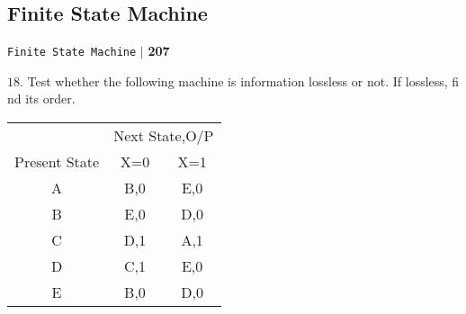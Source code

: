 \documentclass[a4,9pt]{beamer}
\begin{document}
\begin{frame}
\section*{Finite State Machine}
\begin{flushright}
\texttt{Finite State Machine} \hspace*{0.1cm}\textbf{$|$} \hspace*{0.1cm} \textbf{207}\hspace*{0.1cm}
\end{flushright}
\vspace*{0.5cm}

\pause
$18.$ Test whether the following machine is information lossless or not. If lossless, fi nd its order.
\pause
\begin{center}
\begin{tabular}{ccc}
 \hline

 \hline

 \hline

 \hline
 & \multicolumn{2}{c}{Next State,O/P}\\
 \cline{2-3}
Present State & X=0           &   X=1\\
\hline
    A    &  B,0  & E,0 \\
    B    &  E,0  & D,0 \\
    C    &  D,1  & A,1 \\
    D    &  C,1  & E,0 \\
    E    &  B,0  & D,0 \\
 \hline

 \hline

 \hline

 \hline
\end{tabular}
\end{center}

\end{frame}
\end{document}
